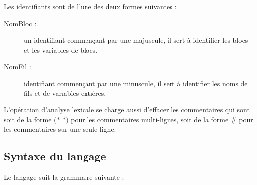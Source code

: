 \documentclass[13pt]{article}
\begin{document}
Les identifiants sont de l'une des deux formes suivantes :
\begin{description}
\item[NomBloc : ] un identifiant commençant par une majuscule, il sert à
  identifier les blocs et les variables de blocs.
\item[NomFil : ] identifiant commençant par une minuscule, il sert à identifier
  les noms de fils et de variables entières.
\end{description}

L'opération d'analyse lexicale se charge aussi d'effacer les commentaires qui
sont soit de la forme \og $(*$\fg{} \og $*)$\fg{} pour les commentaires
multi-lignes, soit de la forme \og \#\fg{} pour les commentaires sur une seule ligne.

\subsection{Syntaxe du langage}
Le langage suit la grammaire suivante :\newline\newline
\end{document}

